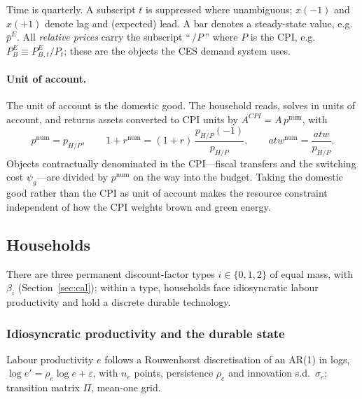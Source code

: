 \documentclass[11pt,a4paper]{article}
\newcommand{\num}{\mathrm{num}}
\newcommand{\PEB}{P^{E}_{B}}
\newcommand{\pE}{p^{E}}
\begin{document}
Time is quarterly. A subscript $t$ is suppressed where unambiguous; $x(-1)$ and
$x(+1)$ denote lag and (expected) lead. A bar denotes a steady-state value,
e.g.\ $\bar\pE$. All \emph{relative prices} carry the subscript ``\,$/P$\,''
where $P$ is the CPI, e.g.\ $\PEB\equiv \PEB{}_{,t}/P_t$; these are the objects
the CES demand system uses.

\paragraph{Unit of account.} The unit of account is the domestic good. The
household reads, solves in units of account, and returns assets converted to CPI
units by $A^{CPI}=A\,p^{\num}$, with
\begin{equation}
p^{\num}=p_{H/P},\qquad
1+r^{\num}=(1+r)\,\frac{p_{H/P}(-1)}{p_{H/P}},\qquad
atw^{\num}=\frac{atw}{p_{H/P}} .
\end{equation}
Objects contractually denominated in the CPI---fiscal transfers and the
switching cost $\psi_g$---are divided by $p^{\num}$ on the way into the budget.
Taking the domestic good rather than the CPI as unit of account makes the
resource constraint independent of how the CPI weights brown and green energy.

\subsection{Households}\label{sec:hh}

There are three permanent discount-factor types $i\in\{0,1,2\}$ of equal mass,
with $\beta_i$ (Section~\ref{sec:cal}); within a type, households face
idiosyncratic labour productivity and hold a discrete durable technology.

\subsubsection{Idiosyncratic productivity and the durable state}

Labour productivity $e$ follows a Rouwenhorst discretisation of an AR(1) in
logs, $\log e' = \rho_e \log e + \varepsilon$, with $n_e$ points, persistence
$\rho_e$ and innovation s.d.\ $\sigma_e$; transition matrix $\Pi$, mean-one grid.
\end{document}

